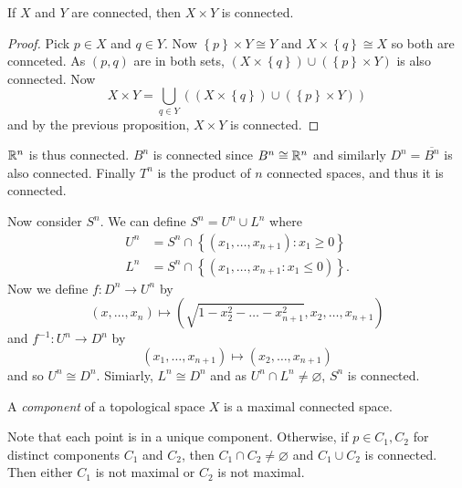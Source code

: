 \begin{theorem}[]
	If $X$ and $Y$ are connected,
	then $X \times Y$ is connected.
\end{theorem}

\begin{proof}
	Pick $p \in X$ and $q \in Y$.
	Now $\left\{
		p
	\right\} \times Y \cong Y$ and $X \times \left\{
		q
	\right\} \cong X$ so both are connceted.
	As $(p,q)$ are in both sets,
	$(X \times \left\{
		q
	\right\}) \cup (\left\{
		p
	\right\} \times Y)$ is also connected.
	Now
	\[
		X \times Y = \bigcup_{q \in Y} \left( 
			\left( 
				X \times \left\{
					q
				\right\} 
			\right) \cup \left( 
				\left\{
					p
				\right\} \times Y 
			\right) 
		\right)
	\]
	and by the previous proposition, $X \times Y$ is connected.
\end{proof}

\begin{example}[]
	$\mathbb{R}^n$ is thus connected.
	$B^n$ is connected since $B^n \cong \mathbb{R}^n$
	and similarly $D^n = \overline{B^n}$ is also connected.
	Finally $T^n$ is the product of $n$ connected spaces,
	and thus it is connected.
\end{example}

\begin{example}
	Now consider $S^n$.
	We can define $S^n = U^n \cup L^n$ where
	\begin{align*}
		U^n &= S^n \cap \left\{
			\left( 
				x_1, \ldots, x_{n+1} 
			\right): x_1 \geq 0
		\right\} \\
		L^n &= S^n \cap \left\{
			\left( 
				x_1, \ldots, x_{n+1}: x_1 \leq 0 
			\right)
		\right\}.
	\end{align*}
	Now we define $f: D^n \to U^n$ by
	\[
		(x, \ldots, x_n) \mapsto \left(
			\sqrt{1 - x_2^2 - \ldots - x_{n+1}^2}, x_2, \ldots, x_{n+1}
		\right)
	\]
	and $f^{-1} : U^n \to D^n$ by
	\[
		(x_1, \ldots, x_{n+1}) \mapsto
		(x_2, \ldots, x_{n+1})
	\]
	and so $U^n \cong D^n$.
	Simiarly, $L^n \cong D^n$ and as
	$U^n \cap L^n \neq \varnothing$, $S^n$ is connected.
\end{example}

\begin{definition}[Component]
	A \emph{component} of a topological space $X$ is a maximal connected
	space.
\end{definition}

Note that each point is in a unique component.
Otherwise, if $p \in C_1, C_2$ for distinct components $C_1$
and $C_2$, then $C_1 \cap C_2 \neq \varnothing$ and
$C_1 \cup C_2$ is connected.
Then either $C_1$ is not maximal or $C_2$ is not maximal.

